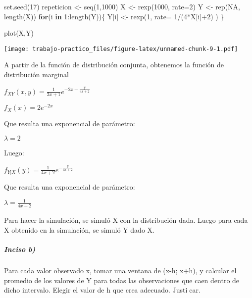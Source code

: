 \documentclass[
]{article}
\newenvironment{Shaded}{\begin{snugshade}}{\end{snugshade}}
\newcommand{\AttributeTok}[1]{\textcolor[rgb]{0.77,0.63,0.00}{#1}}
\newcommand{\ConstantTok}[1]{\textcolor[rgb]{0.00,0.00,0.00}{#1}}
\newcommand{\ControlFlowTok}[1]{\textcolor[rgb]{0.13,0.29,0.53}{\textbf{#1}}}
\newcommand{\DecValTok}[1]{\textcolor[rgb]{0.00,0.00,0.81}{#1}}
\newcommand{\FunctionTok}[1]{\textcolor[rgb]{0.00,0.00,0.00}{#1}}
\newcommand{\NormalTok}[1]{#1}
\newcommand{\OtherTok}[1]{\textcolor[rgb]{0.56,0.35,0.01}{#1}}
\newcommand{\SpecialCharTok}[1]{\textcolor[rgb]{0.00,0.00,0.00}{#1}}
\begin{document}
\begin{Shaded}
\begin{Highlighting}[]
\FunctionTok{set.seed}\NormalTok{(}\DecValTok{17}\NormalTok{)}
\NormalTok{repeticion }\OtherTok{\textless{}{-}} \FunctionTok{seq}\NormalTok{(}\DecValTok{1}\NormalTok{,}\DecValTok{1000}\NormalTok{)}
\NormalTok{X }\OtherTok{\textless{}{-}} \FunctionTok{rexp}\NormalTok{(}\DecValTok{1000}\NormalTok{, }\AttributeTok{rate=}\DecValTok{2}\NormalTok{)}
\NormalTok{Y }\OtherTok{\textless{}{-}} \FunctionTok{rep}\NormalTok{(}\ConstantTok{NA}\NormalTok{, }\FunctionTok{length}\NormalTok{(X))}
\ControlFlowTok{for}\NormalTok{(i }\ControlFlowTok{in} \DecValTok{1}\SpecialCharTok{:}\FunctionTok{length}\NormalTok{(Y))\{}
\NormalTok{  Y[i] }\OtherTok{\textless{}{-}} \FunctionTok{rexp}\NormalTok{(}\DecValTok{1}\NormalTok{, }\AttributeTok{rate=} \DecValTok{1}\SpecialCharTok{/}\NormalTok{(}\DecValTok{4}\SpecialCharTok{*}\NormalTok{X[i]}\SpecialCharTok{+}\DecValTok{2}\NormalTok{) )}
\NormalTok{\}}

\FunctionTok{plot}\NormalTok{(X,Y)}
\end{Highlighting}
\end{Shaded}

\texttt{[image: trabajo-practico\_files/figure-latex/unnamed-chunk-9-1.pdf]}

A partir de la función de distribución conjunta, obtenemos la función de
distribución marginal

\(f_{XY}(x,y)= \frac{1}{2x+1} e^{-2x-\frac{y}{4x+2}}\)

\(f_{X}(x)= 2e^{-2x}\)

Que resulta una exponencial de parámetro:

\(\lambda= 2\)

Luego:

\(f_{Y|X}(y) = \frac{1}{4x+2}e^{-\frac{y}{4x+2}}\)

Que resulta una exponencial de parámetro:

\(\lambda= \frac{1}{4x+2}\)

Para hacer la simulación, se simuló X con la distribución dada. Luego
para cada X obtenido en la simulación, se simuló Y dado X.

\hypertarget{inciso-b-1}{%
\subparagraph{Inciso b)}\label{inciso-b-1}}

Para cada valor observado x, tomar una ventana de (x-h; x+h), y calcular
el promedio de los valores de Y para todas las observaciones que caen
dentro de dicho intervalo. Elegir el valor de h que crea adecuado.
Justicar.
\end{document}
